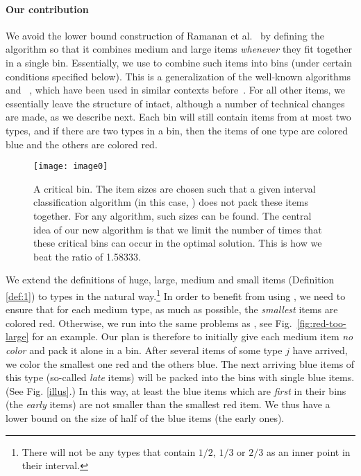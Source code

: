 \paragraph{Our contribution}
We avoid the lower bound construction of Ramanan et al.~\cite{RaBrLL89} by defining
the algorithm so that it combines medium and large items \emph{whenever} they 
fit together in a single bin. 
Essentially, we use {\af} to combine such items into bins (under certain
conditions specified below). This is a generalization of the well-known
algorithms {\ff} and {\bfit}~\cite{Ullman71,GaGrUl72}, which have been used in similar 
contexts before~\cite{babdss15,BaChKK04}. 
For all other items, we essentially leave the structure of {\SuperH} intact, although a number of technical changes are made, as we describe next.
Each bin will still contain items from at most two types, and if there are two types in a bin, then the items of one type are colored blue and the others are colored red.

\begin{figure}\begin{center}
		\texttt{[image: image0]}
		\caption{\label{fig:ramanan}A critical bin.
			The item sizes are chosen such that a given interval classification algorithm 
			(in this case, {\Hpp}) does not pack these items together. For any \SuperH{} algorithm, such sizes can be found.
			The central idea of our new algorithm is that we limit the number of times that these critical bins can occur in the optimal solution.
			This is how we beat the ratio of 1.58333.
		}
	\end{center}
\end{figure}

We extend the definitions of huge, large, medium and small items (Definition \ref{def:1}) to types in the natural way.\footnote{There will not be any types that contain $1/2$, $1/3$ or $2/3$ as an inner point in their interval.}
In order to benefit from using \af, we need to ensure that for each medium type, as much as possible, the \emph{smallest} items are colored red.
Otherwise, we run into the same problems as {\SuperH}, see Fig.~\ref{fig:red-too-large} for an example.
Our plan is therefore to initially give each medium item \emph{no color} and pack it alone in a bin.
After several items of some type $j$ have arrived, we color the smallest one red and the others blue.
The next arriving blue items of this type (so-called \emph{late} items) will be packed into the bins with single blue items.
(See Fig. \ref{illus}.) In this way, at least the blue items which are \emph{first} in their bins (the \emph{early} items) are
not smaller than the smallest red item. We thus have a lower bound on the size of half of the blue items (the early ones).

